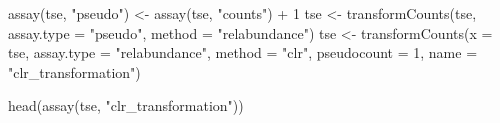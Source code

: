 \documentclass[
]{book}
\newenvironment{Shaded}{\begin{snugshade}}{\end{snugshade}}
\newcommand{\AttributeTok}[1]{\textcolor[rgb]{0.77,0.63,0.00}{#1}}
\newcommand{\DecValTok}[1]{\textcolor[rgb]{0.00,0.00,0.81}{#1}}
\newcommand{\FunctionTok}[1]{\textcolor[rgb]{0.00,0.00,0.00}{#1}}
\newcommand{\NormalTok}[1]{#1}
\newcommand{\OtherTok}[1]{\textcolor[rgb]{0.56,0.35,0.01}{#1}}
\newcommand{\SpecialCharTok}[1]{\textcolor[rgb]{0.00,0.00,0.00}{#1}}
\newcommand{\StringTok}[1]{\textcolor[rgb]{0.31,0.60,0.02}{#1}}
\begin{document}
\begin{Shaded}
\begin{Highlighting}[]
\FunctionTok{assay}\NormalTok{(tse, }\StringTok{"pseudo"}\NormalTok{) }\OtherTok{\textless{}{-}} \FunctionTok{assay}\NormalTok{(tse, }\StringTok{"counts"}\NormalTok{) }\SpecialCharTok{+} \DecValTok{1}
\NormalTok{tse }\OtherTok{\textless{}{-}} \FunctionTok{transformCounts}\NormalTok{(tse, }\AttributeTok{assay.type =} \StringTok{"pseudo"}\NormalTok{, }\AttributeTok{method =} \StringTok{"relabundance"}\NormalTok{)}
\NormalTok{tse }\OtherTok{\textless{}{-}} \FunctionTok{transformCounts}\NormalTok{(}\AttributeTok{x =}\NormalTok{ tse, }\AttributeTok{assay.type =} \StringTok{"relabundance"}\NormalTok{, }\AttributeTok{method =} \StringTok{"clr"}\NormalTok{, }
                        \AttributeTok{pseudocount =} \DecValTok{1}\NormalTok{, }\AttributeTok{name =} \StringTok{"clr\_transformation"}\NormalTok{)}

\FunctionTok{head}\NormalTok{(}\FunctionTok{assay}\NormalTok{(tse, }\StringTok{"clr\_transformation"}\NormalTok{))}
\end{Highlighting}
\end{Shaded}
\end{document}
